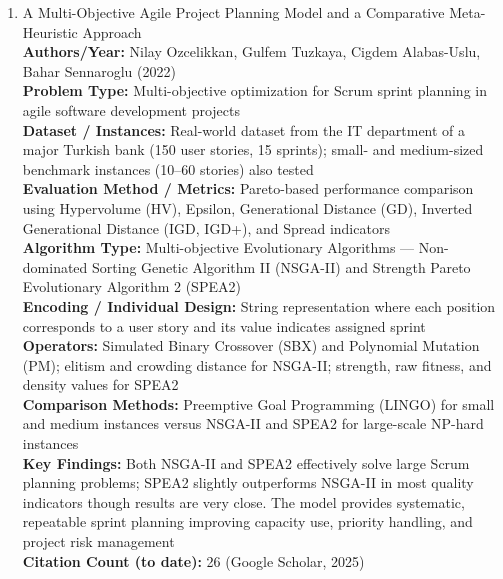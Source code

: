 \documentclass[a4paper,12pt]{article}
\begin{document}
\begin{enumerate}[leftmargin=2em, labelwidth=1em, labelsep=0.5em, itemsep=1ex]
  \item A Multi-Objective Agile Project Planning Model and a Comparative Meta-Heuristic Approach \\
    \textbf{Authors/Year:} Nilay Ozcelikkan, Gulfem Tuzkaya, Cigdem Alabas-Uslu, Bahar Sennaroglu (2022) \\  
    \textbf{Problem Type:} Multi-objective optimization for Scrum sprint planning in agile software development projects \\  
    \textbf{Dataset / Instances:} Real-world dataset from the IT department of a major Turkish bank (150 user stories, 15 sprints); small- and medium-sized benchmark instances (10–60 stories) also tested \\  
    \textbf{Evaluation Method / Metrics:} Pareto-based performance comparison using Hypervolume (HV), Epsilon, Generational Distance (GD), Inverted Generational Distance (IGD, IGD+), and Spread indicators \\  
    \textbf{Algorithm Type:} Multi-objective Evolutionary Algorithms — Non-dominated Sorting Genetic Algorithm II (NSGA-II) and Strength Pareto Evolutionary Algorithm 2 (SPEA2) \\  
    \textbf{Encoding / Individual Design:} String representation where each position corresponds to a user story and its value indicates assigned sprint \\  
    \textbf{Operators:} Simulated Binary Crossover (SBX) and Polynomial Mutation (PM); elitism and crowding distance for NSGA-II; strength, raw fitness, and density values for SPEA2 \\  
    \textbf{Comparison Methods:} Preemptive Goal Programming (LINGO) for small and medium instances versus NSGA-II and SPEA2 for large-scale NP-hard instances \\  
    \textbf{Key Findings:} Both NSGA-II and SPEA2 effectively solve large Scrum planning problems; SPEA2 slightly outperforms NSGA-II in most quality indicators though results are very close. The model provides systematic, repeatable sprint planning improving capacity use, priority handling, and project risk management \\  
    \textbf{Citation Count (to date):} 26 (Google Scholar, 2025) \\[2ex]


\end{enumerate}
\end{document}
